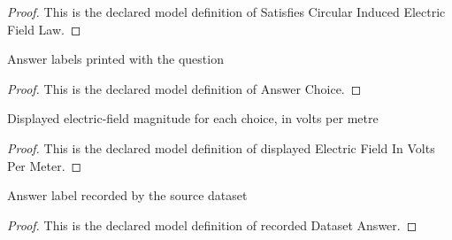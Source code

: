 \begin{proof}
  This is the declared model definition of Satisfies Circular Induced Electric Field Law.
\end{proof}
\begin{definition}
  \label{def:physics:phyx-mini-0938:phyxminiproblems-problemphyxmini0938-answerchoice}
  Answer labels printed with the question
\end{definition}
\begin{proof}
  This is the declared model definition of Answer Choice.
\end{proof}
\begin{definition}
  \label{def:physics:phyx-mini-0938:phyxminiproblems-problemphyxmini0938-answerchoice-displayedelectricfieldinvoltspermeter}
  Displayed electric-field magnitude for each choice, in volts per metre
\end{definition}
\begin{proof}
  This is the declared model definition of displayed Electric Field In Volts Per Meter.
\end{proof}
\begin{definition}
  \label{def:physics:phyx-mini-0938:phyxminiproblems-problemphyxmini0938-recordeddatasetanswer}
  Answer label recorded by the source dataset
\end{definition}
\begin{proof}
  This is the declared model definition of recorded Dataset Answer.
\end{proof}
